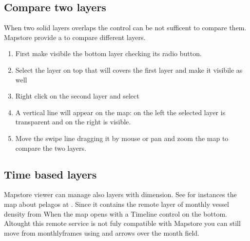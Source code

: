 \documentclass[letterpaper,10pt,english]{sphinxmanual}
\begin{document}
\subsection{Compare two layers}
\label{\detokenize{04_exploring_maps:compare-two-layers}}
\sphinxAtStartPar
When two solid layers overlaps the  control can be not sufficent to compare them.
Mapstore provide a  to compare different layers.
\begin{enumerate}
%
\item {} 
\sphinxAtStartPar
First make visibile the bottom layer checking its radio button.

\item {} 
\sphinxAtStartPar
Select the layer on top that will covers the first layer and make it visibile as well

\item {} 
\sphinxAtStartPar
Right click on the second layer and select 

\item {} 
\sphinxAtStartPar
A vertical line will appear on the map: on the left the selected layer is transparent and on the right is visible.

\item {} 
\sphinxAtStartPar
Move the swipe line dragging it by mouse or pan and zoom the map to compare the two layers.

\end{enumerate}


\subsection{Time based layers}
\label{\detokenize{04_exploring_maps:time-based-layers}}
\sphinxAtStartPar
Mapstore viewer can manage also layers with  dimension. See for instances the map about
pelagos  at .
Since it contains the remote layer of monthly  vessel density from 
When the map opens with a Timeline control on the bottom. Altought this remote service is not fuly compatible with Mapstore
you can still move from monthlyframes using  and  arrows over the month field.
\end{document}
